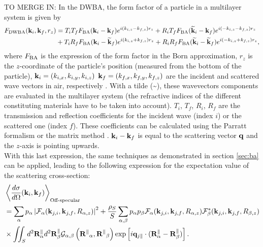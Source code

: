 TO MERGE IN:
In the DWBA, the form factor of a particle in a multilayer system is given by
\begin{align}
F_{\rm{DWBA}} (\mathbf{k}_i,\mathbf{k}_f, r_z) & = T_i T_f F_{\rm{BA}} (\mathbf{k}_i-\mathbf{k}_f) e^{i (k_{i,z}-k_{f,z}) r_z} + R_i T_f F_{\rm{BA}}(\mathbf{\widetilde{k}}_i-\mathbf{k}_f) e^{i(-k_{i,z}-k_{f,z})r_z}
 \nonumber \\
  &+ T_i R_f F_{\rm{BA}}(\mathbf{k}_i-\mathbf{\widetilde{k}}_f)e^{i(k_{i,z}+k_{f,z})r_z} + R_iR_fF_{\rm{BA}} (\mathbf{\widetilde{k}}_i-\mathbf{\widetilde{k}}_f)e^{i(-k_{i,z}+k_{f,z})r_z}, \label{eq:dwbageneral}
\end{align}
where $F_{\rm{BA}}$ is the expression of the form factor in the Born approximation, $r_z$ is the $z$-coordinate of the particle's position (measured from the bottom of the particle), $\mathbf{k}_i=(k_{i,x}, k_{i,y}, k_{i,z})$ $\mathbf{k}_f=(k_{f,x}, k_{f,y}, k_{f,z})$ are the incident and scattered wave vectors in air, respectively \cite{RaSS95}. With a tilde (\~{}), these wavevectors components are evaluated in the multilayer system (the refractive indices of the different constituting materials have to be taken into account). 
$T_i$, $T_f$, $R_i$, $R_f$ are the transmission and reflection coefficients for the incident wave (index $i$) or the scattered one (index $f$). These coefficients can be calculated using the Parratt formalism \cite{Par54} or the matrix method \cite{BoWo99}. $\mathbf{k}_i-\mathbf{k}_f$ is equal to the scattering vector $\mathbf{q}$ and the $z$-axis is pointing upwards.\\

With this last expression, the same techniques as demonstrated in section \ref{sec:ba} can be applied, leading to the following expression for the expectation value of the scattering cross-section:
\begin{align*}
  & \left\langle \frac{d\sigma}{d\Omega}(\mathbf{k}_i,\mathbf{k}_f) \right\rangle_{\text{Off-specular}}  \\
  & = \sum_\alpha p_\alpha \left\lvert \mathcal{F}_\alpha(\mathbf{k}_{j,i},\mathbf{k}_{j,f}, R_{\alpha,z})\right\rvert ^2 + \frac{\rho_S}{S}\sum_{\alpha,\beta} p_\alpha p_\beta \mathcal{F}_\alpha (\mathbf{k}_{j,i},\mathbf{k}_{j,f}, R_{\alpha,z})\mathcal{F}_\beta^*(\mathbf{k}_{j,i},\mathbf{k}_{j,f}, R_{\beta,z}) \\
  & \times \iint_S d^2\mathbf{R}_\alpha^\parallel d^2\mathbf{R}_\beta^\parallel \mathcal{G}_{\alpha ,\beta}\left( \mathbf{R^\parallel}_{\alpha} , \mathbf{R^\parallel}_{\beta} \right) \exp \left[ i\mathbf{q}_{j\parallel}\cdot (\mathbf{R}_\alpha^\parallel - \mathbf{R}_\beta^\parallel ) \right].
\end{align*}

